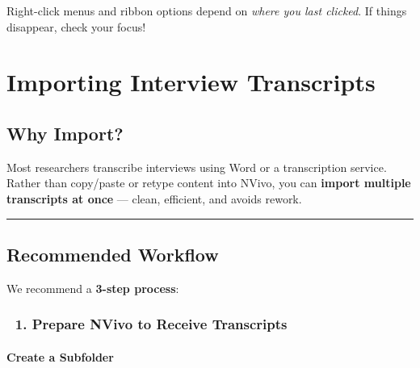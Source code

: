 \documentclass[
  letterpaper,
  DIV=11,
  numbers=noendperiod]{scrreprt}
\begin{document}
\begin{tcolorbox}[enhanced jigsaw, breakable, left=2mm, colback=white, bottomrule=.15mm, colbacktitle=quarto-callout-warning-color!10!white, leftrule=.75mm, title=\textcolor{quarto-callout-warning-color}{\faExclamationTriangle}\hspace{0.5em}{Warning}, colframe=quarto-callout-warning-color-frame, coltitle=black, toptitle=1mm, opacitybacktitle=0.6, toprule=.15mm, titlerule=0mm, bottomtitle=1mm, arc=.35mm, rightrule=.15mm, opacityback=0]

Right-click menus and ribbon options depend on \emph{where you last
clicked}. If things disappear, check your focus!

\end{tcolorbox}

\chapter{Importing Interview
Transcripts}\label{importing-interview-transcripts}

\section{Why Import?}\label{why-import}

Most researchers transcribe interviews using Word or a transcription
service. Rather than copy/paste or retype content into NVivo, you can
\textbf{import multiple transcripts at once} --- clean, efficient, and
avoids rework.

\begin{center}\rule{0.5\linewidth}{0.5pt}\end{center}

\section{Recommended Workflow}\label{recommended-workflow}

We recommend a \textbf{3-step process}:

\subsection{🧱 1. Prepare NVivo to Receive
Transcripts}\label{prepare-nvivo-to-receive-transcripts}

\subsubsection{Create a Subfolder}\label{create-a-subfolder}
\end{document}
